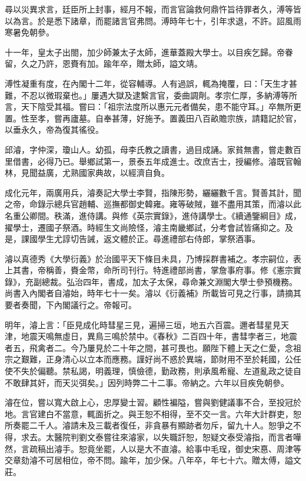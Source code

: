 \begin{pinyinscope}
尋以災異求言，廷臣所上封事，經月不報，而言官論救何鼎忤旨待罪者久，溥等皆以為言。於是悉下諸章，而罷諸言官弗問。溥時年七十，引年求退，不許。詔風雨寒暑免朝參。

十一年，皇太子出閤，加少師兼太子太師，進華蓋殿大學士。以目疾乞歸。帝眷留，久之乃許，恩賚有加。踰年卒，贈太師，謚文靖。

溥性凝重有度，在內閣十二年，從容輔導。人有過誤，輒為掩覆，曰：「天生才甚難，不忍以微瑕棄也。」屢遇大獄及逮繫言官，委曲調劑。孝宗仁厚，多納溥等所言，天下陰受其福。嘗曰：「祖宗法度所以惠元元者備矣，患不能守耳。」卒無所更置。性至孝，嘗再廬墓。自奉甚薄，好施予。置義田八百畝贍宗族，請籍記於官，以垂永久，帝為復其徭役。

邱濬，字仲深，瓊山人。幼孤，母李氏教之讀書，過目成誦。家貧無書，嘗走數百里借書，必得乃已。舉鄉試第一，景泰五年成進士。改庶吉士，授編修。濬既官翰林，見聞益廣，尤熟國家典故，以經濟自負。

成化元年，兩廣用兵，濬奏記大學士李賢，指陳形勢，纚纚數千言。賢善其計，聞之帝，命錄示總兵官趙輔、巡撫都御史韓雍。雍等破賊，雖不盡用其策，而濬以此名重公卿間。秩滿，進侍講。與修《英宗實錄》，進侍講學士。《續通鑒綱目》成，擢學士，遷國子祭酒。時經生文尚險怪，濬主南畿鄉試，分考會試皆痛抑之。及是，課國學生尤諄切告誡，返文體於正。尋進禮部右侍郎，掌祭酒事。

濬以真德秀《大學衍義》於治國平天下條目未具，乃博採群書補之。孝宗嗣位，表上其書，帝稱善，賚金幣，命所司刊行。特進禮部尚書，掌詹事府事。修《憲宗實錄》，充副總裁。弘治四年，書成，加太子太保，尋命兼文淵閣大學士參預機務。尚書入內閣者自濬始，時年七十一矣。濬以《衍義補》所載皆可見之行事，請摘其要者奏聞，下內閣議行之。帝報可。

明年，濬上言：「臣見成化時彗星三見，遍掃三垣，地五六百震。邇者彗星見天津，地震天鳴無虛日，異鳥三鳴於禁中。《春秋》二百四十年，書彗孛者三，地震者五，飛禽者二。今乃屢見於二十年之間，甚可畏也。願陛下體上天之仁愛，念祖宗之艱難，正身清心以立本而應務。謹好尚不惑於異端，節財用不至於耗國，公任使不失於偏聽。禁私謁，明義理，慎儉德，勤政務，則承風希寵、左道亂政之徒自不敢肆其奸，而天災弭矣。」因列時弊二十二事。帝納之。六年以目疾免朝參。

濬在位，嘗以寬大啟上心，忠厚變士習。顧性褊隘，嘗與劉健議事不合，至投冠於地。言官建白不當意，輒面折之。與王恕不相得，至不交一言。六年大計群吏，恕所奏罷二千人。濬請未及三載者復任，非貪暴有顯跡者勿斥，留九十人。恕爭之不得，求去。太醫院判劉文泰嘗往來濬家，以失職訐恕，恕疑文泰受濬指，而言者嘩然，言疏稿出濬手。恕竟坐罷，人以是大不直濬。給事中毛珵，御史宋惪、周津等交章劾濬不可居相位，帝不問。踰年，加少保。八年卒，年七十六。贈太傅，謚文莊。


\end{pinyinscope}
